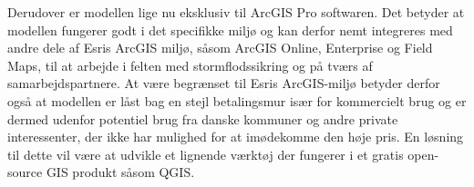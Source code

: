 Derudover er modellen lige nu eksklusiv til ArcGIS Pro softwaren. Det betyder at modellen fungerer godt i det specifikke miljø og kan derfor nemt integreres med andre dele af Esris ArcGIS miljø, såsom ArcGIS Online, Enterprise og Field Maps, til at arbejde i felten med stormflodssikring og på tværs af samarbejdspartnere. At være begrænset til Esris ArcGIS-miljø betyder derfor også at modellen er låst bag en stejl betalingsmur især for kommercielt brug og er dermed udenfor potentiel brug fra danske kommuner og andre private interessenter, der ikke har mulighed for at imødekomme den høje pris. En løsning til dette vil være at udvikle et lignende værktøj der fungerer i et gratis open-source GIS produkt såsom QGIS. \\






  





